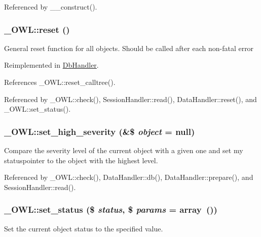 Referenced by \_\-\_\-construct().

\subsubsection[{reset}]{\setlength{\rightskip}{0pt plus 5cm}\_\-OWL::reset ()}\label{class__OWL_a2f2a042bcf31965194c03033df0edc9b}
General reset function for all objects. Should be called after each non-\/fatal error 

Reimplemented in \hyperlink{classDbHandler_a9982df4830f05803935bb31bac7fae3d}{DbHandler}.



References \_\-OWL::reset\_\-calltree().



Referenced by \_\-OWL::check(), SessionHandler::read(), DataHandler::reset(), and \_\-OWL::set\_\-status().

\subsubsection[{set\_\-high\_\-severity}]{\setlength{\rightskip}{0pt plus 5cm}\_\-OWL::set\_\-high\_\-severity (\&\$ {\em object} = {\ttfamily null})}\label{class__OWL_a576829692a3b66e3d518853bf43abae3}
Compare the severity level of the current object with a given one and set my statuspointer to the object with the highest level. 

Referenced by \_\-OWL::check(), DataHandler::db(), DataHandler::prepare(), and SessionHandler::read().

\subsubsection[{set\_\-status}]{\setlength{\rightskip}{0pt plus 5cm}\_\-OWL::set\_\-status (\$ {\em status}, \/  \$ {\em params} = {\ttfamily array~()})}\label{class__OWL_aea912d0ede9b3c2a69b79072d94d4787}
Set the current object status to the specified value.



